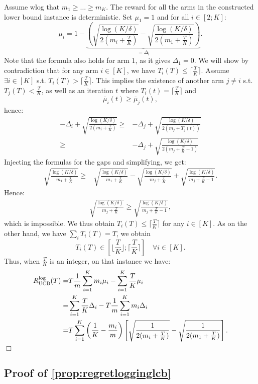  Assume wlog that $m_1\geq \ldots \geq m_K$. The reward for all the arms in the constructed lower bound instance is deterministic.  Set $\mu_1=1$ and for all $i \in [2;K]$:
\[
\mu_i = 1-\underbrace{\left(\sqrt{\frac{\log(K/\delta)}{2(m_i+\frac{T}{K})}}-\sqrt{\frac{\log(K/\delta)}{2(m_1+\frac{T}{K})}}\right)}_{=\Delta_i}.
\]
Note that the formula also holds for arm $1$, as it gives $\Delta_1=0$. We will show  by contradiction that for any arm $i \in [K]$, we have $T_i(T)\leq \lceil\frac{T}{K}\rceil$. Assume $\exists i \in [K]$ s.t. $T_i(T)>\lceil\frac{T}{K}\rceil$. This implies the existence of another arm $j\neq i$ s.t. $T_j(T)<\frac{T}{K}$, as well as an iteration $t$ where $T_i(t)= \lceil\frac{T}{K}\rceil$ and
\[
\overline{\mu}_i(t)\geq\overline{\mu}_j(t), 
\]
hence:
\begin{align*}
-\Delta_i+\sqrt{\frac{\log(K/\delta)}{2(m_i+\frac{T}{K})}}\geq& -\Delta_j+\sqrt{\frac{\log(K/\delta)}{2(m_j+T_j(t))}}\\
\geq& -\Delta_j+\sqrt{\frac{\log(K/\delta)}{2(m_j+\frac{T}{K}-1)}}
\end{align*}
Injecting the formulas for the gaps and simplifying, we get:
\begin{align*}
\sqrt{\frac{\log(K/\delta)}{m_1+\frac{T}{K}}}\geq& \sqrt{\frac{\log(K/\delta)}{m_1+\frac{T}{K}}}-\sqrt{\frac{\log(K/\delta)}{m_j+\frac{T}{K}}}+\sqrt{\frac{\log(K/\delta)}{m_j+\frac{T}{K}-1}}.
\end{align*}
Hence:
\begin{align*}
\sqrt{\frac{\log(K/\delta)}{m_j+\frac{T}{K}}}\geq \sqrt{\frac{\log(K/\delta)}{m_j+\frac{T}{K}-1}},
\end{align*}
which is impossible. We thus obtain $T_i(T)\leq \lceil\frac{T}{K}\rceil$ for any $i\in [K]$. As on the other hand, we have $\sum_i T_i(T)=T$, we obtain
\[
T_i(T)\in \left[\bigg\lfloor\frac{T}{K}\bigg \rfloor;\bigg \lceil\frac{T}{K}\bigg \rceil\right] \quad \forall i \in [K].
\]
Thus, when $\frac{T}{K}$ is an integer, on that instance we have:
\begin{align*}
R^{\text{log}}_{\textsc{UCB}}(T)=&T\frac{1}{m}\sum_{i=1}^Km_i \mu_i- \sum_{i=1}^K\frac{T}{K} \mu_i \\
=&\sum_{i=1}^K\frac{T}{K} \Delta_i -T\frac{1}{m}\sum_{i=1}^Km_i \Delta_i\\
=&T\sum_{i=1}^K\left(\frac{1}{K}-\frac{m_i}{m}\right)\left[\sqrt{\frac{1}{2(m_i+\frac{T}{K})}}-\sqrt{\frac{1}{2(m_1+\frac{T}{K})}}\right].
\end{align*}
\hfill \(\Box\)

\subsection{Proof of \cref{prop:regretlogginglcb}}



